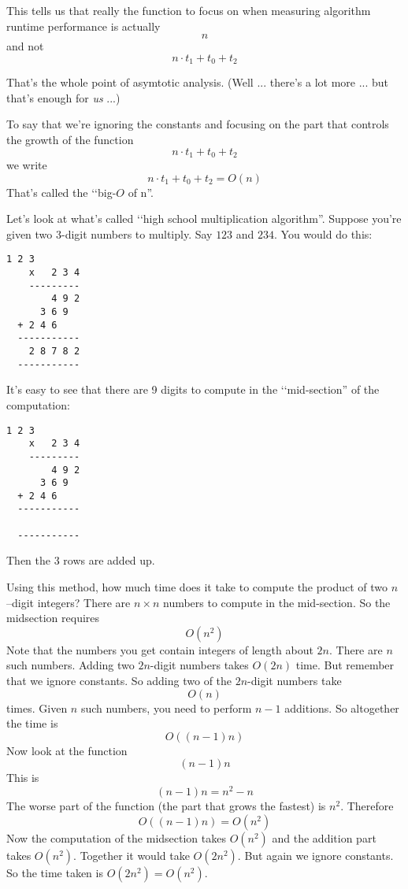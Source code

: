 This tells us that really the function to focus on when
measuring algorithm runtime performance is actually
\[
n
\]
and not
\[
n \cdot t_1 + t_0 + t_2
\]

That's the whole point of asymtotic analysis.
(Well ... there's a lot more ... but that's enough for
\textit{ us} ...)

To say that we're ignoring the constants and focusing on the 
part that controls the growth of the function
\[
n \cdot t_1 + t_0 + t_2
\]
we write
\[
n \cdot t_1 + t_0 + t_2 = O(n)
\]
That's called the \lq\lq big-$O$ of n''.

Let's look at what's called \lq\lq high school multiplication algorithm''.
Suppose you're given two 3-digit numbers to multiply.
Say $123$ and $234$.
You would do this:
\begin{samepage}
\begin{Verbatim}[frame=single]
        1 2 3
    x   2 3 4
    ---------
        4 9 2
      3 6 9
  + 2 4 6
  -----------
    2 8 7 8 2
  -----------
\end{Verbatim}
\end{samepage}
It's easy to see that there are 9 digits to compute in the 
\lq\lq mid-section'' of the computation:
\begin{samepage}
\begin{Verbatim}[frame=single]
        1 2 3
    x   2 3 4
    ---------
        4 9 2
      3 6 9
  + 2 4 6
  -----------
    
  -----------
\end{Verbatim}
\end{samepage}
Then the 3 rows are added up.

Using this method, how much time does it take to compute the 
product of two $n$--digit integers?
There are $n \times n$ numbers to compute in the mid-section.
So the midsection requires 
\[
O(n^2)
\] 
Note that the numbers you get contain integers of length about $2n$.
There are $n$ such numbers.
Adding two $2n$-digit numbers takes $O(2n)$ time.
But remember that we ignore constants.
So adding two of the $2n$-digit numbers take 
\[
O(n)
\] 
times.
Given $n$ such numbers, you need to perform $n-1$ additions.
So altogether the time is
\[
O((n-1)n)
\]
Now look at the function
\[
(n-1)n
\]
This is
\[
(n-1)n = n^2 - n
\]
The worse part of the function (the part that grows the fastest)
is $n^2$.
Therefore
\[
O((n-1)n) = O(n^2)
\]
Now the computation of the midsection takes $O(n^2)$ and the
addition part takes $O(n^2)$.
Together it would take $O(2n^2)$.
But again we ignore constants.
So the time taken is $O(2n^2) = O(n^2)$.

